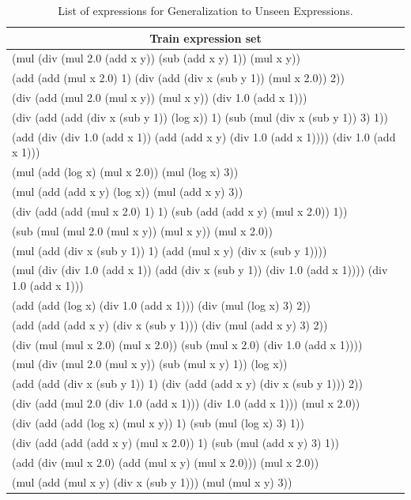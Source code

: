 \documentclass[fullpage,twocolumn]{article} %
\begin{document}
\begin{table}
  \centering
  \caption{List of expressions for Generalization to Unseen Expressions.}
  \begin{tabular}{l}
  \toprule
          \multicolumn{1}{c}{{\bf Train expression set}} \\ \midrule
(mul (div (mul 2.0 (add x y)) (sub (add x y) 1)) (mul x y))  \\
(add (add (mul x 2.0) 1) (div (add (div x (sub y 1)) (mul x 2.0)) 2))  \\
(div (add (mul 2.0 (mul x y)) (mul x y)) (div 1.0 (add x 1)))  \\
(div (add (add (div x (sub y 1)) (log x)) 1) (sub (mul (div x (sub y 1)) 3) 1))  \\
(add (div (div 1.0 (add x 1)) (add (add x y) (div 1.0 (add x 1)))) (div 1.0 (add x 1)))  \\
(mul (add (log x) (mul x 2.0)) (mul (log x) 3))  \\
(mul (add (add x y) (log x)) (mul (add x y) 3))  \\
(div (add (add (mul x 2.0) 1) 1) (sub (add (add x y) (mul x 2.0)) 1))  \\
(sub (mul (mul 2.0 (mul x y)) (mul x y)) (mul x 2.0))  \\
(mul (add (div x (sub y 1)) 1) (add (mul x y) (div x (sub y 1))))  \\
(mul (div (div 1.0 (add x 1)) (add (div x (sub y 1)) (div 1.0 (add x 1)))) (div 1.0 (add x 1)))  \\
(add (add (log x) (div 1.0 (add x 1))) (div (mul (log x) 3) 2))  \\
(add (add (add x y) (div x (sub y 1))) (div (mul (add x y) 3) 2))  \\
(div (mul (mul x 2.0) (mul x 2.0)) (sub (mul x 2.0) (div 1.0 (add x 1))))  \\
(mul (div (mul 2.0 (mul x y)) (sub (mul x y) 1)) (log x))  \\
(add (add (div x (sub y 1)) 1) (div (add (add x y) (div x (sub y 1))) 2))  \\
(div (add (mul 2.0 (div 1.0 (add x 1))) (div 1.0 (add x 1))) (mul x 2.0))  \\
(div (add (add (log x) (mul x y)) 1) (sub (mul (log x) 3) 1))  \\
(div (add (add (add x y) (mul x 2.0)) 1) (sub (mul (add x y) 3) 1))  \\
(add (div (mul x 2.0) (add (mul x y) (mul x 2.0))) (mul x 2.0))  \\
(mul (add (mul x y) (div x (sub y 1))) (mul (mul x y) 3))  \\

\end{tabular}
\end{table}
\end{document}
